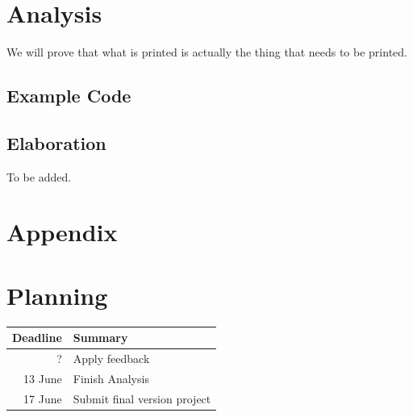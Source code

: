 \documentclass{article}
\begin{document}
\section{Analysis}
We will prove that what is printed is actually the thing that needs to be printed.
\subsection{Example Code}

\subsection{Elaboration}
To be added. %
\newpage
\section*{Appendix}
\appendix
\section{Planning}
\begin{tabular}{|r|l|}
\hline
 Deadline   &  Summary \\
 \hline
    ? & Apply feedback \\
    13 June & Finish Analysis\\
    17 June & Submit final version project \\
    \hline
\end{tabular}

\end{document}
